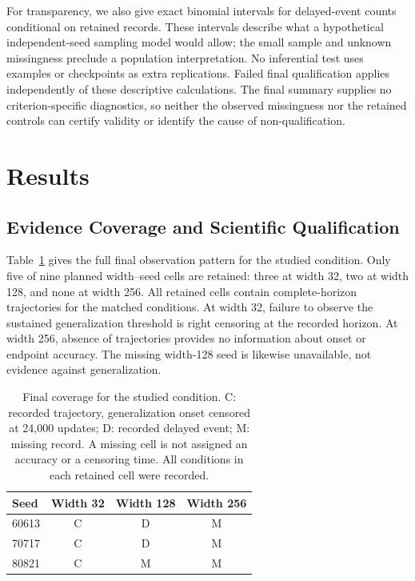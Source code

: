 \documentclass{article}
\begin{document}
For transparency, we also give exact binomial intervals for delayed-event counts conditional on retained records. These intervals describe what a hypothetical independent-seed sampling model would allow; the small sample and unknown missingness preclude a population interpretation. No inferential test uses examples or checkpoints as extra replications. Failed final qualification applies independently of these descriptive calculations. The final summary supplies no criterion-specific diagnostics, so neither the observed missingness nor the retained controls can certify validity or identify the cause of non-qualification.

\section{Results}
\subsection{Evidence Coverage and Scientific Qualification}
Table~\ref{tab:coverage} gives the full final observation pattern for the studied condition. Only five of nine planned width--seed cells are retained: three at width 32, two at width 128, and none at width 256. All retained cells contain complete-horizon trajectories for the matched conditions. At width 32, failure to observe the sustained generalization threshold is right censoring at the recorded horizon. At width 256, absence of trajectories provides no information about onset or endpoint accuracy. The missing width-128 seed is likewise unavailable, not evidence against generalization.

\begin{table}[t]
\centering
\caption{Final coverage for the studied condition. C: recorded trajectory, generalization onset censored at 24,000 updates; D: recorded delayed event; M: missing record. A missing cell is not assigned an accuracy or a censoring time. All conditions in each retained cell were recorded.}
\label{tab:coverage}
\begin{tabular}{lccc}
\toprule
Seed & Width 32 & Width 128 & Width 256 \\
\midrule
60613 & C & D & M \\
70717 & C & D & M \\
80821 & C & M & M \\
\bottomrule
\end{tabular}
\end{table}
\end{document}
